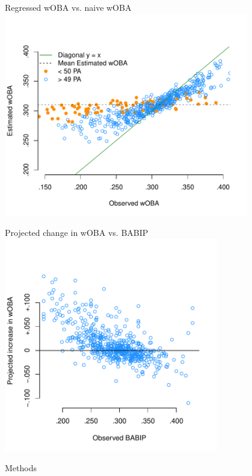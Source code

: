 \documentclass{beamer}
\begin{document}
\begin{frame}{Regressed wOBA vs. naive wOBA}
\centering
\includegraphics[width = 0.8\textwidth]
    {../figs/woba-observed-v-estimated-slides.pdf}
\end{frame}

\begin{frame}{Projected change in wOBA vs. BABIP}
\centering
\includegraphics[width = 0.7\textwidth]{../figs/woba-v-babip-slides.pdf}
\end{frame}

\begin{frame}
\centering\Huge Methods
\end{frame}
\end{document}
